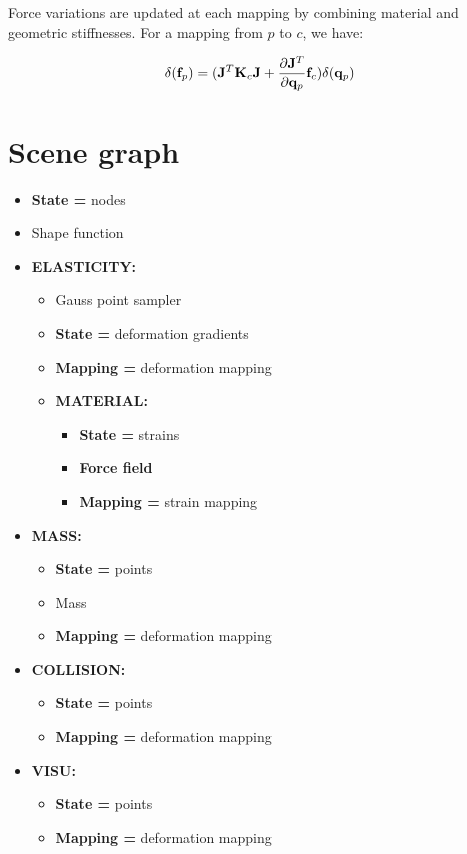 Force variations are updated at each mapping by combining material and geometric stiffnesses. For a mapping from $p$ to $c$, we have:

\begin{equation}
 \delta(\mathbf{{\mathbf{{f}}}}_p) = ( \mathbf{{J}}^T \mathbf{{K}}_c \mathbf{{J}} + \frac{\partial \mathbf{{J}}^T}{\partial \mathbf{{q}}_p} \mathbf{{\mathbf{{f}}}}_c ) \delta(\mathbf{{q}}_p) 
\end{equation}

\newpage
\section{Scene graph}

\begin{itemize}
 \item \textbf{State =} nodes
 \item Shape function

 \item \textbf{ELASTICITY:}
  \begin{itemize}
  \item Gauss point sampler
  \item \textbf{State =} deformation gradients
  \item \textbf{Mapping =} deformation mapping

  \item \textbf{MATERIAL:}
    \begin{itemize}
    \item \textbf{State =} strains
    \item \textbf{Force field}
    \item \textbf{Mapping =} strain mapping
    \end{itemize}
  \end{itemize}

 \item \textbf{MASS:}
    \begin{itemize}
    \item \textbf{State =} points 
    \item Mass
    \item \textbf{Mapping =} deformation mapping
    \end{itemize}
 \item \textbf{COLLISION:}
    \begin{itemize}
    \item \textbf{State =} points 
    \item \textbf{Mapping =} deformation mapping
    \end{itemize}
 \item \textbf{VISU:}
    \begin{itemize}
    \item \textbf{State =} points 
    \item \textbf{Mapping =} deformation mapping
    \end{itemize}

\end{itemize}

